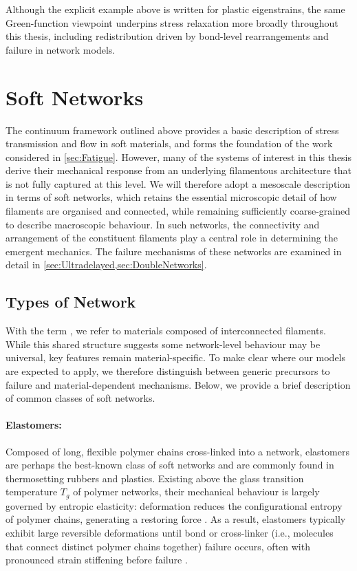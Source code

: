 Although the explicit example above is written for plastic eigenstrains, the same Green-function viewpoint underpins stress relaxation more broadly throughout this thesis, including redistribution driven by bond-level rearrangements and failure in network models.

\section{Soft Networks} \label{sec:Networks}

The continuum framework outlined above provides a basic description of stress transmission and flow in soft materials, and forms the foundation of the work considered in \cref{sec:Fatigue}. However, many of the systems of interest in this thesis derive their mechanical response from an underlying filamentous architecture that is not fully captured at this level. We will therefore adopt a mesoscale description in terms of soft networks, which retains the essential microscopic detail of how filaments are organised and connected, while remaining sufficiently coarse-grained to describe macroscopic behaviour. In such networks, the connectivity and arrangement of the constituent filaments play a central role in determining the emergent mechanics. The failure mechanisms of these networks are examined in detail in \cref{sec:Ultradelayed,sec:DoubleNetworks}.

\subsection{Types of Network} \label{sec:TypesOfNetworks}
With the term , we refer to materials composed of interconnected filaments. While this shared structure suggests some network-level behaviour may be universal, key features remain material-specific. To make clear where our models are expected to apply, we therefore distinguish between generic precursors to failure and material-dependent mechanisms. Below, we provide a brief description of common classes of soft networks.

\paragraph{Elastomers:}
Composed of long, flexible polymer chains cross-linked into a network, elastomers are perhaps the best-known class of soft networks and are commonly found in thermosetting rubbers and plastics. Existing above the glass transition temperature $T_g$ of polymer networks, their mechanical behaviour is largely governed by entropic elasticity: deformation reduces the configurational entropy of polymer chains, generating a restoring force \cite{treloarElasticityRelatedProperties1973}. As a result, elastomers typically exhibit large reversible deformations until bond or cross-linker (i.e., molecules that connect distinct polymer chains together) failure occurs, often with pronounced strain stiffening before failure \cite{kimMeasurementNonlinearMechanical2011}.

